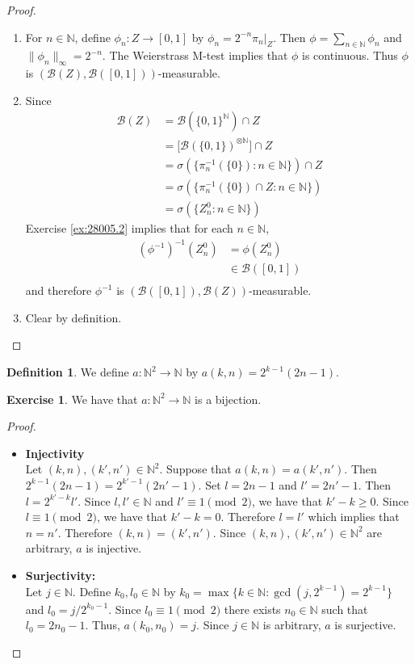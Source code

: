 \documentclass{book}
\theoremstyle{definition}
\newtheorem{defn}[definition]{Definition}
\newtheorem{ex}[definition]{Exercise}
\newcommand{\sig}{\sigma}
\newcommand{\N}{\mathbb{N}}
\newcommand{\MB}{\mathcal{B}}
\newcommand{\rex}[1]{Exercise \ref{ex:#1}}
\DeclareMathOperator*{\0}{\mbf{0}}
\DeclareMathOperator*{\1}{\mbf{1}}
\begin{document}
	\begin{proof}\
		\begin{enumerate}
			\item For $n \in \N$, define $\phi_n: Z \rightarrow [0, 1]$ by $\phi_n = 2^{-n}\pi_n|_{Z}$. Then $\phi = \sum\limits_{n \in \N} \phi_n$ and $\|\phi_n\|_{\infty} = 2^{-n}$. The Weierstrass M-test implies that $\phi$ is continuous. Thus $\phi$ is $(\MB(Z), \MB([0,1]))$-measurable. \\
			\item Since 
			\begin{align*}
				\MB(Z) 
				& = \MB(\{0, 1\}^{\N}) \cap Z \\
				& = \bigg[ \MB(\{0,1\})^{\otimes \N} \bigg] \cap Z \\
				& = \sig(\{\pi_n^{-1}(\{0\}): n \in \N\}) \cap Z \\
				& = \sig (\{\pi_n^{-1}(\{0\}) \cap Z: n \in \N\} )\\
				& = \sig (\{Z_n^0: n \in \N\})
			\end{align*}
			\rex{28005.2} implies that for each $n \in \N$, 
			\begin{align*}
				(\phi^{-1})^{-1} (Z_n^0) 
				& = \phi(Z_n^0) \\
				& \in \MB([0,1]) \\
			\end{align*}
			and therefore $\phi^{-1}$ is $(\MB([0,1]), \MB(Z))$-measurable.
			\item Clear by definition.
		\end{enumerate}
	\end{proof}

		\begin{defn}
		We define $a: \N^2 \rightarrow \N$ by $a(k,n) = 2^{k-1}(2n-1)$. 
	\end{defn}
	
	\begin{ex}
		We have that $a: \N^2 \rightarrow \N$ is a bijection.
	\end{ex}
	
	\begin{proof}\
		\begin{itemize}
			\item \textbf{Injectivity} \\ 
			Let $(k,n), (k', n') \in \N^2$. Suppose that $a(k,n) = a(k',n')$. Then $2^{k-1}(2n-1) = 2^{k'-1}(2n'-1)$. Set $l = 2n-1$ and $l' = 2n'-1$. Then $l = 2^{k'-k}l'$. Since $l,l' \in \N$ and $l' \equiv 1 \pmod{2}$, we have that $k'-k \geq 0$. Since $l \equiv 1 \pmod{2}$, we have that $k'-k = 0$. Therefore $l = l'$ which implies that $n = n'$. Therefore $(k,n) = (k', n')$. Since  $(k,n), (k', n') \in \N^2$ are arbitrary, $a$ is injective.
			\item \textbf{Surjectivity:} \\
			Let $j \in \N$. Define $k_0,l_0 \in \N$ by $k_0 = \max \{k \in \N: \gcd(j, 2^{k-1}) = 2^{k-1}\}$ and $l_0 = j/2^{k_0-1}$. Since $l_0 \equiv 1 \pmod{2}$ there exists $n_0 \in \N$ such that $l_0 = 2n_0-1$. Thus, $a(k_0, n_0) = j$. Since $j \in \N$ is arbitrary, $a$ is surjective.
		\end{itemize}
	\end{proof}
\end{document}
